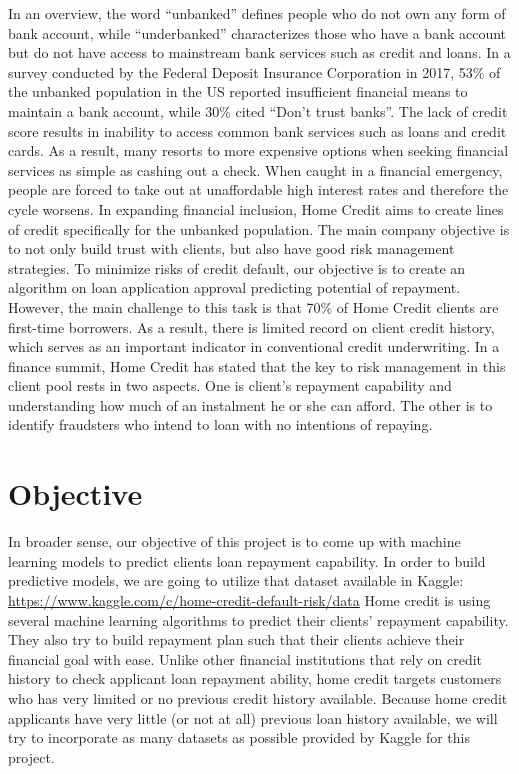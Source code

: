 \documentclass[]{book}
\begin{document}
In an overview, the word ``unbanked'' defines people who do not own any form of bank account, while ``underbanked'' characterizes those who have a bank account but do not have access to mainstream bank services such as credit and loans. In a survey conducted by the Federal Deposit Insurance Corporation in 2017, 53\% of the unbanked population in the US reported insufficient financial means to maintain a bank account, while 30\% cited ``Don't trust banks''. The lack of credit score results in inability to access common bank services such as loans and credit cards. As a result, many resorts to more expensive options when seeking financial services as simple as cashing out a check. When caught in a financial emergency, people are forced to take out at unaffordable high interest rates and therefore the cycle worsens.
In expanding financial inclusion, Home Credit aims to create lines of credit specifically for the unbanked population. The main company objective is to not only build trust with clients, but also have good risk management strategies. To minimize risks of credit default, our objective is to create an algorithm on loan application approval predicting potential of repayment. However, the main challenge to this task is that 70\% of Home Credit clients are first-time borrowers. As a result, there is limited record on client credit history, which serves as an important indicator in conventional credit underwriting. In a finance summit, Home Credit has stated that the key to risk management in this client pool rests in two aspects. One is client's repayment capability and understanding how much of an instalment he or she can afford. The other is to identify fraudsters who intend to loan with no intentions of repaying.

\hypertarget{objective}{%
\chapter{Objective}\label{objective}}

In broader sense, our objective of this project is to come up with machine learning models to predict clients loan repayment capability. In order to build predictive models, we are going to utilize that dataset available in Kaggle: \url{https://www.kaggle.com/c/home-credit-default-risk/data}
Home credit is using several machine learning algorithms to predict their clients' repayment capability. They also try to build repayment plan such that their clients achieve their financial goal with ease. Unlike other financial institutions that rely on credit history to check applicant loan repayment ability, home credit targets customers who has very limited or no previous credit history available. Because home credit applicants have very little (or not at all) previous loan history available, we will try to incorporate as many datasets as possible provided by Kaggle for this project.
\end{document}
